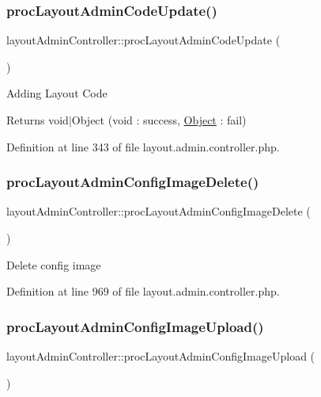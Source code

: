 \subsubsection{\texorpdfstring{proc\+Layout\+Admin\+Code\+Update()}{procLayoutAdminCodeUpdate()}}
{\footnotesize\ttfamily layout\+Admin\+Controller\+::proc\+Layout\+Admin\+Code\+Update (\begin{DoxyParamCaption}{ }\end{DoxyParamCaption})}

Adding Layout Code \begin{DoxyReturn}{Returns}
void$\vert$\+Object (void \+: success, \hyperlink{classObject}{Object} \+: fail) 
\end{DoxyReturn}


Definition at line 343 of file layout.\+admin.\+controller.\+php.

\mbox{\label{classlayoutAdminController_ae6b9af868b9694fc6ad85c9496595d24}} 
\subsubsection{\texorpdfstring{proc\+Layout\+Admin\+Config\+Image\+Delete()}{procLayoutAdminConfigImageDelete()}}
{\footnotesize\ttfamily layout\+Admin\+Controller\+::proc\+Layout\+Admin\+Config\+Image\+Delete (\begin{DoxyParamCaption}{ }\end{DoxyParamCaption})}

Delete config image 

Definition at line 969 of file layout.\+admin.\+controller.\+php.

\mbox{\label{classlayoutAdminController_a24154a31e823e961c03d808257147700}} 
\subsubsection{\texorpdfstring{proc\+Layout\+Admin\+Config\+Image\+Upload()}{procLayoutAdminConfigImageUpload()}}
{\footnotesize\ttfamily layout\+Admin\+Controller\+::proc\+Layout\+Admin\+Config\+Image\+Upload (\begin{DoxyParamCaption}{ }\end{DoxyParamCaption})}

